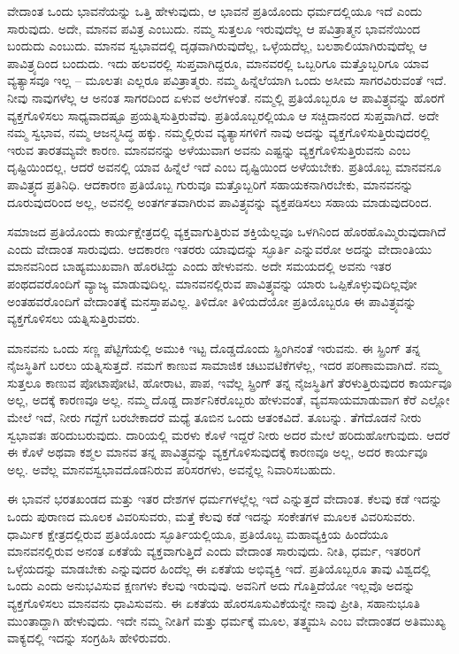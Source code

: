 ವೇದಾಂತ ಒಂದು ಭಾವನೆಯನ್ನು ಒತ್ತಿ ಹೇಳುವುದು, ಆ ಭಾವನೆ ಪ್ರತಿಯೊಂದು ಧರ್ಮದಲ್ಲಿಯೂ ಇದೆ ಎಂದು ಸಾರುವುದು. ಅದೇ, ಮಾನವ ಪವಿತ್ರ ಎಂಬುದು. ನಮ್ಮ ಸುತ್ತಲೂ ಇರುವುದೆಲ್ಲ ಆ ಪವಿತ್ರಾತ್ಮನ ಭಾವನೆಯಿಂದ ಬಂದುದು ಎಂಬುದು. ಮಾನವ ಸ್ವಭಾವದಲ್ಲಿ ದೃಢವಾಗಿರುವುದೆಲ್ಲ, ಒಳ್ಳೆಯದೆಲ್ಲ, ಬಲಶಾಲಿಯಾಗಿರುವುದೆಲ್ಲ ಆ ಪಾವಿತ್ರ್ಯದಿಂದ ಬಂದುದು. ಇದು ಹಲವರಲ್ಲಿ ಸುಪ್ತವಾಗಿದ್ದರೂ, ಮಾನವರಲ್ಲಿ ಒಬ್ಬರಿಗೂ ಮತ್ತೊಬ್ಬರಿಗೂ ಯಾವ ವ್ಯತ್ಯಾಸವೂ ಇಲ್ಲ – ಮೂಲತಃ ಎಲ್ಲರೂ ಪವಿತ್ರಾತ್ಮರು. ನಮ್ಮ ಹಿನ್ನೆಲೆಯಾಗಿ ಒಂದು ಅಸೀಮ ಸಾಗರವಿರುವಂತೆ ಇದೆ. ನೀವು ನಾವುಗಳೆಲ್ಲ ಆ ಅನಂತ ಸಾಗರದಿಂದ ಏಳುವ ಅಲೆಗಳಂತೆ. ನಮ್ಮಲ್ಲಿ ಪ್ರತಿಯೊಬ್ಬರೂ ಆ ಪಾವಿತ್ರ್ಯವನ್ನು ಹೊರಗೆ ವ್ಯಕ್ತಗೊಳಿಸಲು ಸಾಧ್ಯವಾದಷ್ಟೂ ಪ್ರಯತ್ನಿಸುತ್ತಿರುವೆವು. ಪ್ರತಿಯೊಬ್ಬರಲ್ಲಿಯೂ ಆ ಸಚ್ಚಿದಾನಂದ ಸುಪ್ತವಾಗಿದೆ. ಅದೇ ನಮ್ಮ ಸ್ವಭಾವ, ನಮ್ಮ ಆಜನ್ಮಸಿದ್ಧ ಹಕ್ಕು. ನಮ್ಮಲ್ಲಿರುವ ವ್ಯತ್ಯಾಸಗಳಿಗೆ ನಾವು ಅದನ್ನು ವ್ಯಕ್ತಗೊಳಿಸುತ್ತಿರುವುದರಲ್ಲಿ ಇರುವ ತಾರತಮ್ಯವೇ ಕಾರಣ. ಮಾನವನನ್ನು ಅಳೆಯುವಾಗ ಅವನು ಎಷ್ಟನ್ನು ವ್ಯಕ್ತಗೊಳಿಸುತ್ತಿರುವನು ಎಂಬ ದೃಷ್ಟಿಯಿಂದಲ್ಲ, ಆದರೆ ಅವನಲ್ಲಿ ಯಾವ ಹಿನ್ನೆಲೆ ಇದೆ ಎಂಬ ದೃಷ್ಟಿಯಿಂದ ಅಳೆಯಬೇಕು. ಪ್ರತಿಯೊಬ್ಬ ಮಾನವನೂ ಪಾವಿತ್ರ್ಯದ ಪ್ರತಿನಿಧಿ. ಆದಕಾರಣ ಪ್ರತಿಯೊಬ್ಬ ಗುರುವೂ ಮತ್ತೊಬ್ಬರಿಗೆ ಸಹಾಯಕನಾಗಿರಬೇಕು, ಮಾನವನನ್ನು ದೂರುವುದರಿಂದ ಅಲ್ಲ, ಅವನಲ್ಲಿ ಅಂತರ್ಗತವಾಗಿರುವ ಪಾವಿತ್ರ್ಯವನ್ನು ವ್ಯಕ್ತಪಡಿಸಲು ಸಹಾಯ ಮಾಡುವುದರಿಂದ.

\vskip 2pt

ಸಮಾಜದ ಪ್ರತಿಯೊಂದು ಕಾರ್ಯಕ್ಷೇತ್ರದಲ್ಲಿ ವ್ಯಕ್ತವಾಗುತ್ತಿರುವ ಶಕ್ತಿಯೆಲ್ಲವೂ ಒಳಗಿನಿಂದ ಹೊರಹೊಮ್ಮಿರುವುದಾಗಿದೆ ಎಂದು ವೇದಾಂತ ಸಾರುವುದು. ಆದಕಾರಣ ಇತರರು ಯಾವುದನ್ನು ಸ್ಫೂರ್ತಿ ಎನ್ನುವರೋ ಅದನ್ನು ವೇದಾಂತಿಯು ಮಾನವನಿಂದ ಬಾಹ್ಯಮುಖವಾಗಿ ಹೊರಟಿದ್ದು ಎಂದು ಹೇಳುವನು. ಅದೇ ಸಮಯದಲ್ಲಿ ಅವನು ಇತರ ಪಂಥದವರೊಂದಿಗೆ ವ್ಯಾಜ್ಯ ಮಾಡುವುದಿಲ್ಲ. ಮಾನವನಲ್ಲಿರುವ ಪಾವಿತ್ರ್ಯವನ್ನು ಯಾರು ಒಪ್ಪಿಕೊಳ್ಳುವುದಿಲ್ಲವೋ ಅಂತಹವರೊಂದಿಗೆ ವೇದಾಂತಕ್ಕೆ ಮನಸ್ತಾಪವಿಲ್ಲ. ತಿಳಿದೋ ತಿಳಿಯದೆಯೋ ಪ್ರತಿಯೊಬ್ಬರೂ ಈ ಪಾವಿತ್ರ್ಯವನ್ನು ವ್ಯಕ್ತಗೊಳಿಸಲು ಯತ್ನಿಸುತ್ತಿರುವರು.

\vskip 2pt

ಮಾನವನು ಒಂದು ಸಣ್ಣ ಪೆಟ್ಟಿಗೆಯಲ್ಲಿ ಅಮುಕಿ ಇಟ್ಟ ದೊಡ್ಡದೊಂದು ಸ್ಪ್ರಿಂಗಿನಂತೆ ಇರುವನು. ಈ ಸ್ಪ್ರಿಂಗ್ ತನ್ನ ನೈಜಸ್ಥಿತಿಗೆ ಬರಲು ಯತ್ನಿಸುತ್ತದೆ. ನಮಗೆ ಕಾಣುವ ಸಾಮಾಜಿಕ ಚಟುವಟಿಕೆಗಳೆಲ್ಲ, ಇದರ ಪರಿಣಾಮವಾಗಿದೆ. ನಮ್ಮ ಸುತ್ತಲೂ ಕಾಣುವ ಪೋಟಾಪೋಟಿ, ಹೋರಾಟ, ಪಾಪ, ಇವೆಲ್ಲ ಸ್ಪ್ರಿಂಗ್ ತನ್ನ ನೈಜಸ್ಥಿತಿಗೆ ತೆರಳುತ್ತಿರುವುದರ ಕಾರ್ಯವೂ ಅಲ್ಲ, ಅದಕ್ಕೆ ಕಾರಣವೂ ಅಲ್ಲ. ನಮ್ಮ ದೊಡ್ಡ ದಾರ್ಶನಿಕರೊಬ್ಬರು ಹೇಳುವಂತೆ, ವ್ಯವಸಾಯಮಾಡುವಾಗ ಕೆರೆ ಎಲ್ಲೋ ಮೇಲೆ ಇದೆ, ನೀರು ಗದ್ದೆಗೆ ಬರಬೇಕಾದರೆ ಮಧ್ಯೆ ತೂಬಿನ ಒಂದು ಆತಂಕವಿದೆ. ತೂಬನ್ನು. ತೆಗೆದೊಡನೆ ನೀರು ಸ್ವಭಾವತಃ ಹರಿದುಬರುವುದು. ದಾರಿಯಲ್ಲಿ ಮರಳು ಕೊಳೆ ಇದ್ದರೆ ನೀರು ಅದರ ಮೇಲೆ ಹರಿದುಹೋಗುವುದು. ಆದರೆ ಈ ಕೊಳೆ ಅಥವಾ ಕಶ್ಮಲ ಮಾನವ ತನ್ನ ಪಾವಿತ್ರ್ಯವನ್ನು ವ್ಯಕ್ತಗೊಳಿಸುವುದಕ್ಕೆ ಕಾರಣವೂ ಅಲ್ಲ, ಅದರ ಕಾರ್ಯವೂ ಅಲ್ಲ. ಅವೆಲ್ಲ ಮಾನವಸ್ವಭಾವದೊಡನಿರುವ ಪರಿಸರಗಳು, ಅವನ್ನೆಲ್ಲ ನಿವಾರಿಸಬಹುದು.

ಈ ಭಾವನೆ ಭರತಖಂಡದ ಮತ್ತು ಇತರ ದೇಶಗಳ ಧರ್ಮಗಳಲ್ಲೆಲ್ಲ ಇದೆ ಎನ್ನುತ್ತದೆ ವೇದಾಂತ. ಕೆಲವು ಕಡೆ ಇದನ್ನು ಒಂದು ಪುರಾಣದ ಮೂಲಕ ವಿವರಿಸುವರು, ಮತ್ತೆ ಕೆಲವು ಕಡೆ ಇದನ್ನು ಸಂಕೇತಗಳ ಮೂಲಕ ವಿವರಿಸುವರು. ಧಾರ್ಮಿಕ ಕ್ಷೇತ್ರದಲ್ಲಿರುವ ಪ್ರತಿಯೊಂದು ಸ್ಫೂರ್ತಿಯಲ್ಲಿಯೂ, ಪ್ರತಿಯೊಬ್ಬ ಮಹಾವ್ಯಕ್ತಿಯ ಹಿಂದೆಯೂ ಮಾನವನಲ್ಲಿರುವ ಅನಂತ ಏಕತೆಯೆ ವ್ಯಕ್ತವಾಗುತ್ತಿದೆ ಎಂದು ವೇದಾಂತ ಸಾರುವುದು. ನೀತಿ, ಧರ್ಮ, ಇತರರಿಗೆ ಒಳ್ಳೆಯದನ್ನು ಮಾಡಬೇಕು ಎನ್ನುವುದರ ಹಿಂದೆಲ್ಲ ಈ ಏಕತೆಯ ಅಭಿವ್ಯಕ್ತಿ ಇದೆ. ಪ್ರತಿಯೊಬ್ಬರೂ ತಾವು ವಿಶ್ವದಲ್ಲಿ ಒಂದು ಎಂದು ಅನುಭವಿಸುವ ಕ್ಷಣಗಳು ಕೆಲವು ಇರುವುವು. ಅವನಿಗೆ ಅದು ಗೊತ್ತಿದೆಯೋ ಇಲ್ಲವೊ ಅದನ್ನು ವ್ಯಕ್ತಗೊಳಿಸಲು ಮಾನವನು ಧಾವಿಸುವನು. ಈ ಏಕತೆಯ ಹೊರಸೂಸುವಿಕೆಯನ್ನೇ ನಾವು ಪ್ರೀತಿ, ಸಹಾನುಭೂತಿ ಮುಂತಾದ್ದಾಗಿ ಹೇಳುವುದು. ಇದೇ ನಮ್ಮ ನೀತಿಗೆ ಮತ್ತು ಧರ್ಮಕ್ಕೆ ಮೂಲ, ತತ್ತ್ವಮಸಿ ಎಂಬ ವೇದಾಂತದ ಅತಿಮುಖ್ಯ ವಾಕ್ಯದಲ್ಲಿ ಇದನ್ನು ಸಂಗ್ರಹಿಸಿ ಹೇಳಿರುವರು.

